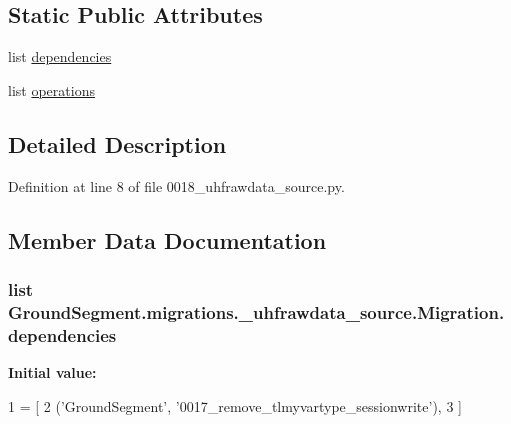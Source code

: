 \subsection*{Static Public Attributes}
\begin{DoxyCompactItemize}
\item 
list \hyperlink{class_ground_segment_1_1migrations_1_10018__uhfrawdata__source_1_1_migration_a1a9e65a2889af9d05d87c01c3c70fb18}{dependencies}
\item 
list \hyperlink{class_ground_segment_1_1migrations_1_10018__uhfrawdata__source_1_1_migration_a15d7ce4696e8007f9c283fbb33bd103d}{operations}
\end{DoxyCompactItemize}


\subsection{Detailed Description}


Definition at line 8 of file 0018\+\_\+uhfrawdata\+\_\+source.\+py.



\subsection{Member Data Documentation}
\hypertarget{class_ground_segment_1_1migrations_1_10018__uhfrawdata__source_1_1_migration_a1a9e65a2889af9d05d87c01c3c70fb18}{}
\subsubsection[{dependencies}]{\setlength{\rightskip}{0pt plus 5cm}list Ground\+Segment.\+migrations.\+\_\+uhfrawdata\+\_\+source.\+Migration.\+dependencies\hspace{0.3cm}{\ttfamily [static]}}\label{class_ground_segment_1_1migrations_1_10018__uhfrawdata__source_1_1_migration_a1a9e65a2889af9d05d87c01c3c70fb18}
{\bfseries Initial value\+:}
\begin{DoxyCode}
1 = [
2         (\textcolor{stringliteral}{'GroundSegment'}, \textcolor{stringliteral}{'0017\_remove\_tlmyvartype\_sessionwrite'}),
3     ]
\end{DoxyCode}


